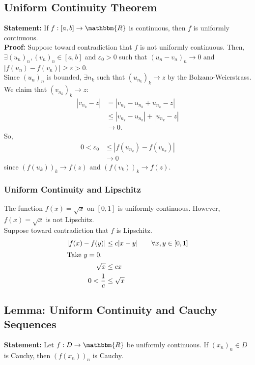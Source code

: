 \documentclass[10pt]{extarticle}
\newcommand{\R}{\mathbbm{R}}
\begin{document}
  \subsection{Uniform Continuity Theorem}%
    \textbf{Statement:} If $f: [a,b] \rightarrow \R$ is continuous, then $f$ is uniformly continuous.\\

    \textbf{Proof:} Suppose toward contradiction that $f$ is not uniformly continuous. Then, $\exists (u_n)_n,(v_n)_n\in [a,b]$ and $\varepsilon_0 > 0$ such that $(u_n - v_n)_n \rightarrow 0$ and $|f(u_n)-f(v_n)| \geq \varepsilon>0$.\\

    Since $(u_n)_n$ is bounded, $\exists n_k$ such that $(u_{n_k})_k \rightarrow z$ by the Bolzano-Weierstrass. We claim that $(v_{n_k})_k \rightarrow z$:
    \begin{align*}
      \left|v_{n_k} - z\right| &= \left|v_{n_k} - u_{n_k} + u_{n_k} - z\right|\\
                               &\leq \left|v_{n_k} - u_{n_k}\right| + \left|u_{n_k} - z\right|\\
                               &\rightarrow 0.
    \end{align*}
    So,
    \begin{align*}
      0 < \varepsilon_0 &\leq |f(u_{n_k}) - f(v_{n_k})|\\
                    &\rightarrow 0
    \end{align*}
    since $(f(u_k))_k \rightarrow f(z)$ and $\left(f(v_k)\right)_k \rightarrow f(z)$.
  \subsubsection{Uniform Continuity and Lipschitz}%
    The function $f(x) = \sqrt{x}$ on $[0,1]$ is uniformly continuous. However, $f(x) = \sqrt{x}$ is not Lipschitz.\\

    Suppose toward contradiction that $f$ is Lipschitz.
    \begin{align*}
      |f(x) - f(y)| &\leq c|x-y| \tag*{$\forall x,y\in [0,1]$}\\
      \shortintertext{Take $y = 0$.}
      \sqrt{x} &\leq cx\\
      0 < \frac{1}{c} &\leq \sqrt{x}
    \end{align*}
  \subsection{Lemma: Uniform Continuity and Cauchy Sequences}%
    \textbf{Statement:} Let $f: D\rightarrow \R$ be uniformly continuous. If $(x_n)_n\in D$ is Cauchy, then $\left(f(x_n)\right)_n$ is Cauchy.\\
\end{document}
